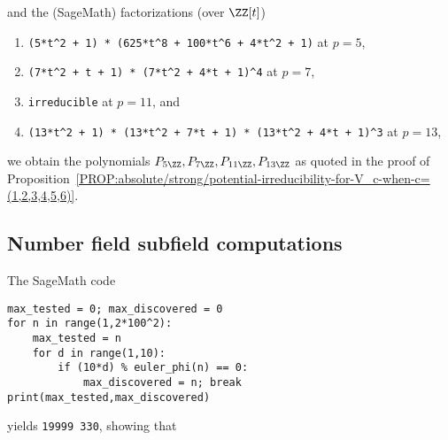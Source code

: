 \documentclass[12pt]{report}
\begin{document}
and the (SageMath) factorizations (over $\ZZ[t]$)
\begin{enumerate}[(1)]
    \item \verb!(5*t^2 + 1) * (625*t^8 + 100*t^6 + 4*t^2 + 1)! at $p=5$,
    
    \item \verb!(7*t^2 + t + 1) * (7*t^2 + 4*t + 1)^4! at $p=7$,
    
    \item \verb!irreducible! at $p=11$,
    and
    
    \item \verb!(13*t^2 + 1) * (13*t^2 + 7*t + 1) * (13*t^2 + 4*t + 1)^3! at $p=13$,
\end{enumerate}
we obtain
the polynomials $P_{5\ZZ},P_{7\ZZ},P_{11\ZZ},P_{13\ZZ}$
as quoted in the proof of Proposition~\ref{PROP:absolute/strong/potential-irreducibility-for-V_c-when-c=(1,2,3,4,5,6)}.

\subsection{Number field subfield computations}
\label{SUBSEC:number-field-subfield-code-and-data}

The SageMath code
\begin{verbatim}
max_tested = 0; max_discovered = 0
for n in range(1,2*100^2):
    max_tested = n
    for d in range(1,10):
        if (10*d) % euler_phi(n) == 0:
            max_discovered = n; break
print(max_tested,max_discovered)
\end{verbatim}
yields
\verb!19999 330!,
showing that
\end{document}
